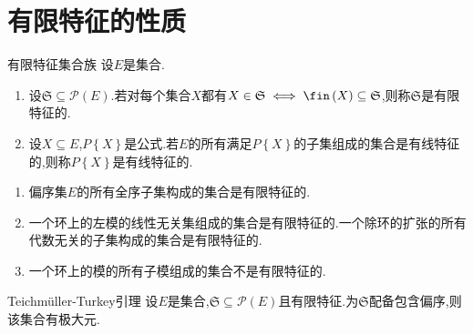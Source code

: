 \section{有限特征的性质}

\begin{definition}{有限特征集合族}{}
	设$E$是集合.
	\begin{enumerate}
		\item 设$\mathfrak{S}\subseteq\mathcal{P}\left(E\right)$.若对每个集合$X$都有$X\in\mathfrak{S}\iff\fin\left(X\right)\subseteq\mathfrak{S}$,则称$\mathfrak{S}$是有限特征的.
		\item 设$X\subseteq E$,$P\left\{X\right\}$是公式.若$E$的所有满足$P\left\{X\right\}$的子集组成的集合是有线特征的,则称$P\left\{X\right\}$是有线特征的.
	\end{enumerate}
\end{definition}

\begin{example}{}{}
	\begin{enumerate}
		\item 偏序集$E$的所有全序子集构成的集合是有限特征的.
		\item 一个环上的左模的线性无关集组成的集合是有限特征的.一个除环的扩张的所有代数无关的子集构成的集合是有限特征的.
		\item 一个环上的模的所有子模组成的集合不是有限特征的.
	\end{enumerate}
\end{example}

\begin{theorem}{Teichm\"{u}ller-Turkey引理}{}
	设$E$是集合,$\mathfrak{S}\subseteq\mathcal{P}\left(E\right)$且有限特征.为$\mathfrak{S}$配备包含偏序,则该集合有极大元.
\end{theorem}


































